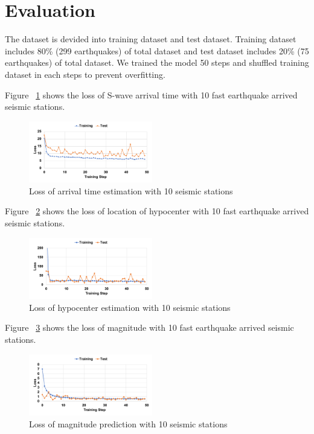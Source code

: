 \section{Evaluation}

The dataset is devided into training dataset and test dataset. Training dataset includes 80\% (299 earthquakes) of total dataset and test dataset includes 20\% (75 earthquakes) of total dataset. We trained the model 50 steps and shuffled training dataset in each steps to prevent overfitting.


Figure ~\ref{fig:arrival_loss_10} shows the loss of S-wave arrival time with 10 fast earthquake arrived seismic stations.

\begin{figure}[t]
\includegraphics[width=0.48\textwidth]{figs/arrival_loss_10.pdf}
\caption{Loss of arrival time estimation with 10 seismic stations}
\label{fig:arrival_loss_10}
\end{figure}

Figure ~\ref{fig:center_loss_10} shows the loss of location of hypocenter with 10 fast earthquake arrived seismic stations.

\begin{figure}[t]
\includegraphics[width=0.48\textwidth]{figs/center_loss_10.pdf}
\caption{Loss of hypocenter estimation with 10 seismic stations}
\label{fig:center_loss_10}
\end{figure}

Figure ~\ref{fig:mag_loss_10} shows the loss of magnitude with 10 fast earthquake arrived seismic stations.

\begin{figure}[t]
\includegraphics[width=0.48\textwidth]{figs/mag_loss_10.pdf}
\caption{Loss of magnitude prediction with 10 seismic stations}
\label{fig:mag_loss_10}
\end{figure}

